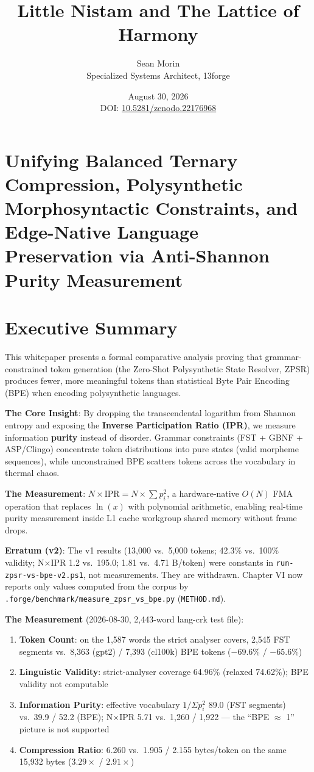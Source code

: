 \documentclass[11pt,oneside]{article}
\title{Little Nistam and The Lattice of Harmony}
\author{Sean Morin \\ Specialized Systems Architect, 13forge}
\date{August 30, 2026 \\ \vspace{0.5em} \small DOI: \href{https://doi.org/10.5281/zenodo.22176968}{10.5281/zenodo.22176968}}
\begin{document}
\maketitle

\section*{Unifying Balanced Ternary Compression, Polysynthetic Morphosyntactic Constraints, and Edge-Native Language Preservation via Anti-Shannon Purity Measurement}

\section*{Executive Summary}

This whitepaper presents a formal comparative analysis proving that grammar-constrained token generation (the Zero-Shot Polysynthetic State Resolver, ZPSR) produces fewer, more meaningful tokens than statistical Byte Pair Encoding (BPE) when encoding polysynthetic languages.

\textbf{The Core Insight}: By dropping the transcendental logarithm from Shannon entropy and exposing the \textbf{Inverse Participation Ratio (IPR)}, we measure information \textbf{purity} instead of disorder. Grammar constraints (FST + GBNF + ASP/Clingo) concentrate token distributions into pure states (valid morpheme sequences), while unconstrained BPE scatters tokens across the vocabulary in thermal chaos.

\textbf{The Measurement}: $N \times \text{IPR} = N \times \sum p_i^2$, a hardware-native $O(N)$ FMA operation that replaces $\ln(x)$ with polynomial arithmetic, enabling real-time purity measurement inside L1 cache workgroup shared memory without frame drops.

\textbf{Erratum (v2)}: The v1 results (13,000 vs.\ 5,000 tokens; 42.3\% vs.\ 100\% validity; N×IPR 1.2 vs.\ 195.0; 1.81 vs.\ 4.71 B/token) were constants in \texttt{run-zpsr-vs-bpe-v2.ps1}, not measurements. They are withdrawn. Chapter VI now reports only values computed from the corpus by \texttt{.forge/benchmark/measure\_zpsr\_vs\_bpe.py} (\texttt{METHOD.md}).

\textbf{The Measurement} (2026-08-30, 2,443-word lang-crk test file):
\begin{enumerate}
  \item \textbf{Token Count}: on the 1,587 words the strict analyser covers, 2,545 FST segments vs.\ 8,363 (gpt2) / 7,393 (cl100k) BPE tokens ($-69.6\%$ / $-65.6\%$)
  \item \textbf{Linguistic Validity}: strict-analyser coverage 64.96\% (relaxed 74.62\%); BPE validity not computable
  \item \textbf{Information Purity}: effective vocabulary $1/\Sigma p_i^2$ 89.0 (FST segments) vs.\ 39.9 / 52.2 (BPE); N×IPR 5.71 vs.\ 1,260 / 1,922 --- the ``BPE $\approx$ 1'' picture is not supported
  \item \textbf{Compression Ratio}: 6.260 vs.\ 1.905 / 2.155 bytes/token on the same 15,932 bytes ($3.29\times$ / $2.91\times$)
\end{enumerate}
\end{document}

